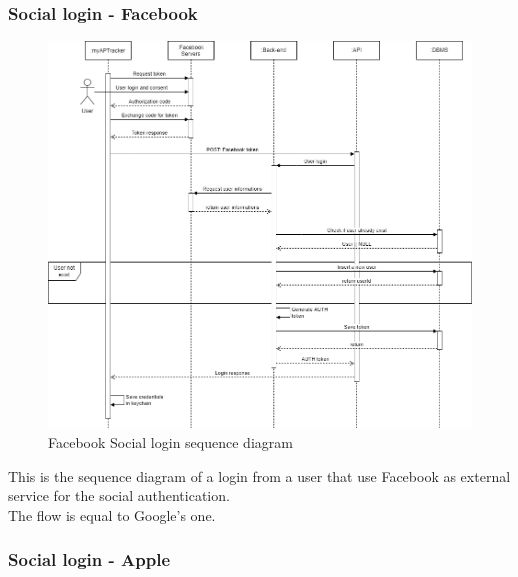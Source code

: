\subsubsection{Social login - Facebook}

\begin{figure}[h!]
        \centering
        \includegraphics[scale=0.40]{images/runtime_view/social_login_facebook.png}
        \caption{Facebook Social login sequence diagram}
        \label{fig:facebook_social_login_sequence_diagram}
\end{figure}
\FloatBarrier

This is the sequence diagram of a login from a user that use Facebook as external service for the social authentication.\\
The flow is equal to Google's one.
\newpage
\subsubsection{Social login - Apple}

